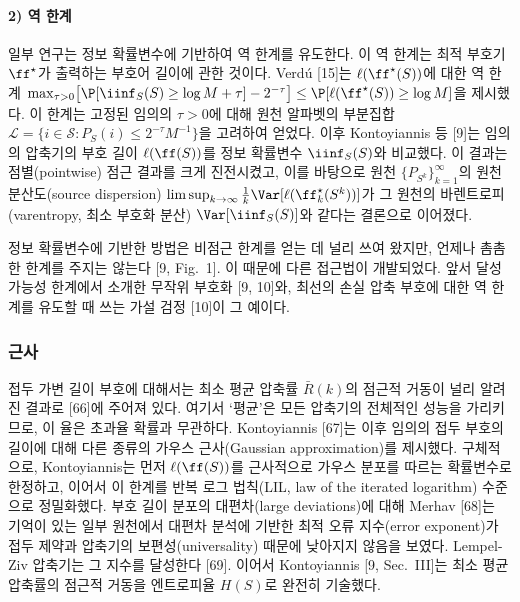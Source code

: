 \paragraph{2) 역 한계}
일부 연구는 정보 확률변수에 기반하여 역 한계를 유도한다. 이 역 한계는 최적 부호기 $\ff^\star$가 출력하는 부호어 길이에 관한 것이다. Verdú [15]는 $\ell(\ff^\star(S))$에 대한 역 한계 $\max_{\tau>0}\bigl[\P[\iinf_S(S)\ge\log M+\tau]-2^{-\tau}\bigr]\le\P[\ell(\ff^\star(S))\ge\log M]$을 제시했다. 이 한계는 고정된 임의의 $\tau>0$에 대해 원천 알파벳의 부분집합 $\mathcal{L}=\{i\in\mathcal{S}:P_S(i)\le 2^{-\tau}M^{-1}\}$을 고려하여 얻었다. 이후 Kontoyiannis 등 [9]는 임의의 압축기의 부호 길이 $\ell(\ff(S))$를 정보 확률변수 $\iinf_S(S)$와 비교했다. 이 결과는 점별(pointwise) 점근 결과를 크게 진전시켰고, 이를 바탕으로 원천 $\{P_{S^k}\}_{k=1}^\infty$의 원천 분산도(source dispersion) $\limsup_{k\to\infty}\frac{1}{k}\Var[\ell(\ff_k^\star(S^k))]$가 그 원천의 바렌트로피(varentropy, 최소 부호화 분산) $\Var[\iinf_S(S)]$와 같다는 결론으로 이어졌다.

정보 확률변수에 기반한 방법은 비점근 한계를 얻는 데 널리 쓰여 왔지만, 언제나 촘촘한 한계를 주지는 않는다 [9, Fig.~1]. 이 때문에 다른 접근법이 개발되었다. 앞서 달성 가능성 한계에서 소개한 무작위 부호화 [9, 10]와, 최선의 손실 압축 부호에 대한 역 한계를 유도할 때 쓰는 가설 검정 [10]이 그 예이다.

\subsubsection{근사}

접두 가변 길이 부호에 대해서는 최소 평균 압축률 $\bar{R}(k)$의 점근적 거동이 널리 알려진 결과로 [66]에 주어져 있다. 여기서 `평균'은 모든 압축기의 전체적인 성능을 가리키므로, 이 율은 초과율 확률과 무관하다. Kontoyiannis [67]는 이후 임의의 접두 부호의 길이에 대해 다른 종류의 가우스 근사(Gaussian approximation)를 제시했다. 구체적으로, Kontoyiannis는 먼저 $\ell(\ff(S))$를 근사적으로 가우스 분포를 따르는 확률변수로 한정하고, 이어서 이 한계를 반복 로그 법칙(LIL, law of the iterated logarithm) 수준으로 정밀화했다. 부호 길이 분포의 대편차(large deviations)에 대해 Merhav [68]는 기억이 있는 일부 원천에서 대편차 분석에 기반한 최적 오류 지수(error exponent)가 접두 제약과 압축기의 보편성(universality) 때문에 낮아지지 않음을 보였다. Lempel-Ziv 압축기는 그 지수를 달성한다 [69]. 이어서 Kontoyiannis [9, Sec.~III]는 최소 평균 압축률의 점근적 거동을 엔트로피율 $H(S)$로 완전히 기술했다.


